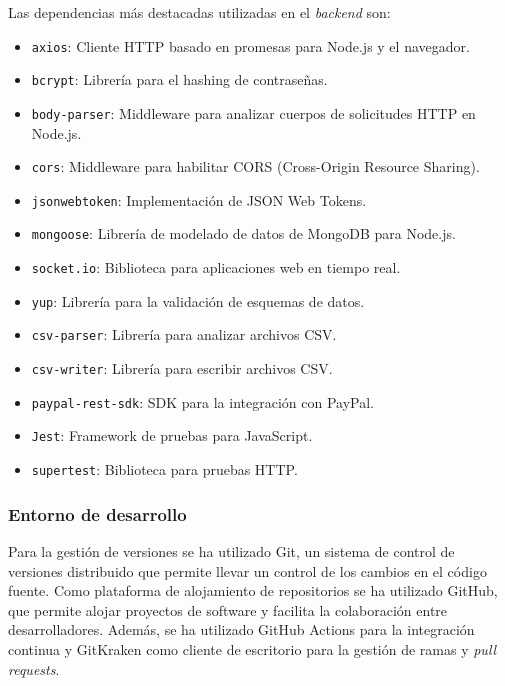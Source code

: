 Las dependencias más destacadas utilizadas en el \textit{backend} son:
\begin{itemize}
    \item \texttt{axios}: Cliente HTTP basado en promesas para Node.js y el navegador.
    \item \texttt{bcrypt}: Librería para el hashing de contraseñas.
    \item \texttt{body-parser}: Middleware para analizar cuerpos de solicitudes HTTP en Node.js.
    \item \texttt{cors}: Middleware para habilitar CORS (Cross-Origin Resource Sharing).
    \item \texttt{jsonwebtoken}: Implementación de JSON Web Tokens.
    \item \texttt{mongoose}: Librería de modelado de datos de MongoDB para Node.js.
    \item \texttt{socket.io}: Biblioteca para aplicaciones web en tiempo real.
    \item \texttt{yup}: Librería para la validación de esquemas de datos.
    \item \texttt{csv-parser}: Librería para analizar archivos CSV.
    \item \texttt{csv-writer}: Librería para escribir archivos CSV.
    \item \texttt{paypal-rest-sdk}: SDK para la integración con PayPal.
    \item \texttt{Jest}: Framework de pruebas para JavaScript.
    \item \texttt{supertest}: Biblioteca para pruebas HTTP.
\end{itemize}



\subsubsection{Entorno de desarrollo}
Para la gestión de versiones se ha utilizado Git\cite{git}, un sistema de control de versiones distribuido que permite llevar un control de los cambios en el código fuente.
Como plataforma de alojamiento de repositorios se ha utilizado GitHub\cite{github}, que permite alojar proyectos de software y facilita la colaboración entre desarrolladores.
Además, se ha utilizado GitHub Actions para la integración continua y GitKraken\cite{gitkraken} como cliente de escritorio para la gestión de ramas y \textit{pull requests}.


